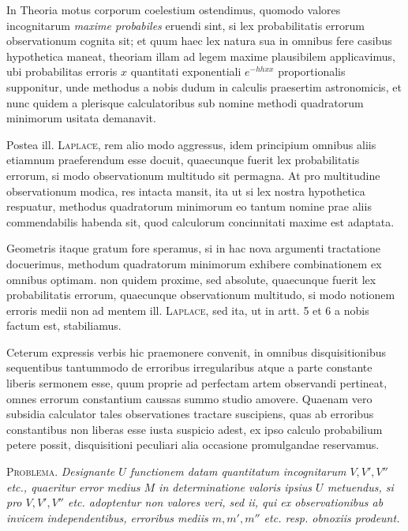 In Theoria motus corporum coelestium ostendimus, quomodo valores incognitarum \textit{maxime probabiles} eruendi sint, si lex probabilitatis errorum observationum cognita sit; et quum haec lex natura sua in omnibus fere casibus hypothetica maneat, theoriam illam ad legem maxime plausibilem applicavimus, ubi probabilitas erroris \(x\) quantitati exponentiali \(e^{-hhxx}\) proportionalis supponitur, unde methodus a nobis dudum in calculis praesertim astronomicis, et nunc quidem a plerisque calculatoribus sub nomine methodi quadratorum minimorum usitata demanavit.

Postea ill. \textsc{Laplace}, rem alio modo aggressus, idem principium omnibus aliis etiamnum praeferendum esse docuit, quaecunque fuerit lex probabilitatis errorum, si modo observationum multitudo sit permagna. At pro multitudine observationum modica, res intacta mansit, ita ut si lex nostra hypothetica respuatur, methodus quadratorum minimorum eo tantum nomine prae aliis commendabilis habenda sit, quod calculorum concinnitati maxime est adaptata.

Geometris itaque gratum fore speramus, si in hac nova argumenti tractatione docuerimus, methodum quadratorum minimorum exhibere combinationem ex omnibus optimam. non quidem proxime, sed absolute, quaecunque fuerit lex probabilitatis errorum, quaecunque observationum multitudo, si modo notionem erroris medii non ad mentem ill. \textsc{Laplace}, sed ita, ut in artt. 5 et 6 a nobis factum est, stabiliamus.

Ceterum expressis verbis hic praemonere convenit, in omnibus disquisitionibus sequentibus tantummodo de erroribus irregularibus atque a parte constante liberis sermonem esse, quum proprie ad perfectam artem observandi pertineat, omnes errorum constantium caussas summo studio amovere. Quaenam vero subsidia calculator tales observationes tractare suscipiens, quas ab erroribus constantibus non liberas esse iusta suspicio adest, ex ipso calculo probabilium petere possit, disquisitioni peculiari alia occasione promulgandae reservamus.

\textsc{Problema.} \textit{Designante \(U\) functionem datam quantitatum incognitarum \(V,V',V''\) etc., quaeritur error medius \(M\) in determinatione valoris ipsius \(U\) metuendus, si pro \(V,V',V''\) etc. adoptentur non valores veri, sed ii, qui ex observationibus ab invicem independentibus, erroribus mediis \(m,m',m''\) etc. resp. obnoxiis prodeunt.}

